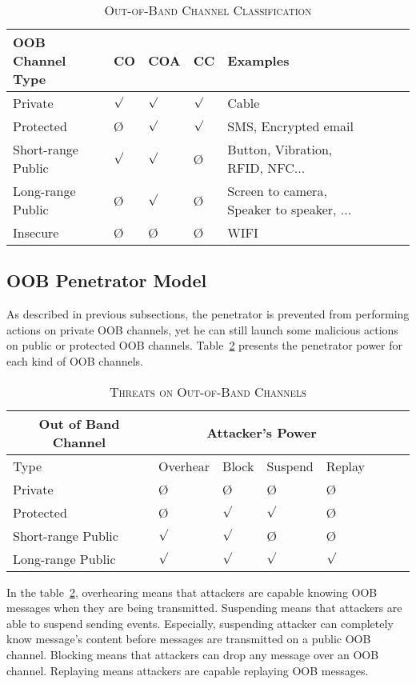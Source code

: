 \begin{table}
\centering
\caption{\textsc{Out-of-Band Channel Classification}}
\label{tableproperties}
{\scriptsize
\begin{tabular}{ l l l l l l l l | }
\hline
OOB Channel Type & CO & COA & CC & Examples \\
\hline\hline
Private & $\surd$ & $\surd$ & $\surd$ & Cable \\ \hline
Protected & \O & $\surd$ & $\surd$ & SMS, Encrypted email \\ \hline
Short-range Public & $\surd$ & $\surd$ & \O & Button, Vibration, RFID, NFC... \\ \hline
Long-range Public & \O & $\surd$& \O & Screen to camera, Speaker to speaker, ... \\ \hline
Insecure & \O & \O & \O & WIFI \\ 
\end{tabular}
}
\end{table}


\subsection{OOB Penetrator Model}

As described in previous subsections, the penetrator is prevented from performing actions on private OOB channels, yet he can still launch some malicious actions on public or protected OOB channels. Table~\ref{tableattack} presents the penetrator power for each kind of OOB channels.

\begin{table}
\centering
\caption{\textsc{Threats on Out-of-Band Channels}}
\label{tableattack}
{\scriptsize
\begin{tabular}{ l l l l l l l l | }
\hline
\multicolumn{1}{c}{Out of Band Channel} & \multicolumn{4}{c}{Attacker's Power} \\
\hline
\hline
Type & Overhear & Block & Suspend & Replay \\
\hline\hline
Private & \O & \O & \O & \O  \\ \hline
Protected & \O & $\surd$ & $\surd$ & \O  \\ \hline
Short-range Public & $\surd$ & $\surd$ & \O & \O  \\ \hline
Long-range Public & $\surd$ & $\surd$ & $\surd$& $\surd$ \\ \hline
\end{tabular}
}
\end{table}

In the table~\ref{tableattack}, overhearing means that attackers are capable knowing OOB messages when they are being transmitted. Suspending means that attackers are able to suspend sending events. Especially, suspending attacker can completely know message's content before messages are transmitted on a public OOB channel. Blocking means that attackers can drop any message over an OOB channel. Replaying means attackers are capable replaying OOB messages. 

